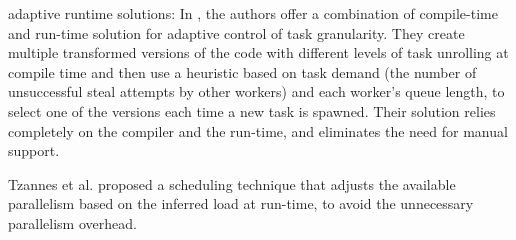adaptive runtime solutions:
In \cite{thoman2013adaptive}, the authors offer a combination of compile-time and run-time solution for adaptive control of task granularity. They create multiple transformed versions of the code with different levels of task unrolling at compile time and then use a heuristic based on task demand (the number of unsuccessful steal attempts by other workers) and each worker's queue length, to select one of the versions each time a new task is spawned\cite{thoman2013adaptive}. Their solution relies completely on the compiler and the run-time, and eliminates the need for manual support.

Tzannes et al. proposed a scheduling technique that adjusts the available parallelism based on the inferred load at run-time, to avoid the unnecessary parallelism overhead\cite{tzannes2014lazy}. 

\cite{moreira1995performance}
\cite{aguilar2019line}	
\cite{wagle2019runtime}	
	
	
%
%
%
%
%	
%
%	
%
\vspace{\baselineskip}


